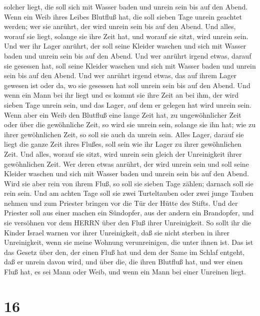 solcher liegt, die soll sich mit Wasser baden und unrein sein bis auf
den Abend.  Wenn ein Weib ihres Leibes Blutfluß hat, die
soll sieben Tage unrein geachtet werden; wer sie anrührt, der wird
unrein sein bis auf den Abend.  Und alles, worauf sie
liegt, solange sie ihre Zeit hat, und worauf sie sitzt, wird unrein
sein.  Und wer ihr Lager anrührt, der soll seine Kleider
waschen und sich mit Wasser baden und unrein sein bis auf den Abend.
 Und wer anrührt irgend etwas, darauf sie gesessen hat,
soll seine Kleider waschen und sich mit Wasser baden und unrein sein bis
auf den Abend.  Und wer anrührt irgend etwas, das auf ihrem
Lager gewesen ist oder da, wo sie gesessen hat soll unrein sein bis auf
den Abend.  Und wenn ein Mann bei ihr liegt und es kommt
sie ihre Zeit an bei ihm, der wird sieben Tage unrein sein, und das
Lager, auf dem er gelegen hat wird unrein sein.  Wenn aber
ein Weib den Blutfluß eine lange Zeit hat, zu ungewöhnlicher Zeit oder
über die gewöhnliche Zeit, so wird sie unrein sein, solange sie ihn hat;
wie zu ihrer gewöhnlichen Zeit, so soll sie auch da unrein sein.
 Alles Lager, darauf sie liegt die ganze Zeit ihres Flußes,
soll sein wie ihr Lager zu ihrer gewöhnlichen Zeit. Und alles, worauf
sie sitzt, wird unrein sein gleich der Unreinigkeit ihrer gewöhnlichen
Zeit.  Wer deren etwas anrührt, der wird unrein sein und
soll seine Kleider waschen und sich mit Wasser baden und unrein sein bis
auf den Abend.  Wird sie aber rein von ihrem Fluß, so soll
sie sieben Tage zählen; darnach soll sie rein sein.  Und am
achten Tage soll sie zwei Turteltauben oder zwei junge Tauben nehmen und
zum Priester bringen vor die Tür der Hütte des Stifts.  Und
der Priester soll aus einer machen ein Sündopfer, aus der andern ein
Brandopfer, und sie versöhnen vor dem HERRN über den Fluß ihrer
Unreinigkeit.  So sollt ihr die Kinder Israel warnen vor
ihrer Unreinigkeit, daß sie nicht sterben in ihrer Unreinigkeit, wenn
sie meine Wohnung verunreinigen, die unter ihnen ist.  Das
ist das Gesetz über den, der einen Fluß hat und dem der Same im Schlaf
entgeht, daß er unrein davon wird,  und über die, die ihren
Blutfluß hat, und wer einen Fluß hat, es sei Mann oder Weib, und wenn
ein Mann bei einer Unreinen liegt.

\hypertarget{section-15}{%
\section{16}\label{section-15}}

